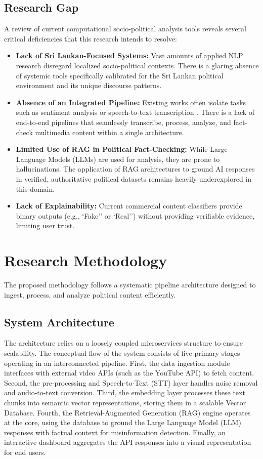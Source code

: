 \documentclass[12pt,a4paper]{report}
\begin{document}
\section{Research Gap}
A review of current computational socio-political analysis tools reveals several critical deficiencies that this research intends to resolve:
\begin{itemize}
    \item \textbf{Lack of Sri Lankan-Focused Systems:} Vast amounts of applied NLP research disregard localized socio-political contexts. There is a glaring absence of systemic tools specifically calibrated for the Sri Lankan political environment and its unique discourse patterns.
    \item \textbf{Absence of an Integrated Pipeline:} Existing works often isolate tasks such as sentiment analysis or speech-to-text transcription \cite{singhal2019}. There is a lack of end-to-end pipelines that seamlessly transcribe, process, analyze, and fact-check multimedia content within a single architecture.
    \item \textbf{Limited Use of RAG in Political Fact-Checking:} While Large Language Models (LLMs) are used for analysis, they are prone to hallucinations. The application of RAG architectures to ground AI responses in verified, authoritative political datasets remains heavily underexplored in this domain.
    \item \textbf{Lack of Explainability:} Current commercial content classifiers provide binary outputs (e.g., `Fake'' or `Real'') without providing verifiable evidence, limiting user trust.
\end{itemize}

\chapter{Research Methodology}
The proposed methodology follows a systematic pipeline architecture designed to ingest, process, and analyze political content efficiently.

\section{System Architecture}
The architecture relies on a loosely coupled microservices structure to ensure scalability. The conceptual flow of the system consists of five primary stages operating in an interconnected pipeline. First, the data ingestion module interfaces with external video APIs (such as the YouTube API) to fetch content. Second, the pre-processing and Speech-to-Text (STT) layer handles noise removal and audio-to-text conversion. Third, the embedding layer processes these text chunks into semantic vector representations, storing them in a scalable Vector Database. Fourth, the Retrieval-Augmented Generation (RAG) engine operates at the core, using the database to ground the Large Language Model (LLM) responses with factual context for misinformation detection. Finally, an interactive dashboard aggregates the API responses into a visual representation for end users.
\end{document}
